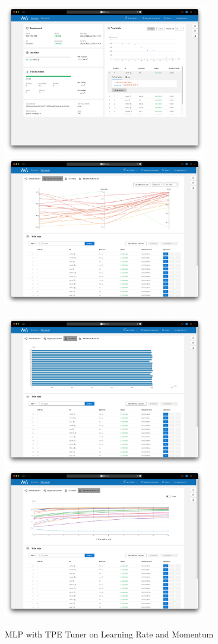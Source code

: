 \documentclass{article}
\begin{document}
\begin{figure}
	\centerline{\includegraphics[width=3.5in]{../proj3/figures/mlp_tpe_overview.png}\includegraphics[width=3.5in]{../proj3/figures/mlp_tpe_hyperparameter.png}}
	\centerline{\includegraphics[width=3.5in]{../proj3/figures/mlp_tpe_latency.png}\includegraphics[width=3.5in]{../proj3/figures/mlp_tpe_intermediate.png}}
	\caption{MLP with TPE Tuner on Learning Rate and Momentum}
	\label{fig:mlp-tpe}
\end{figure}
\end{document}
